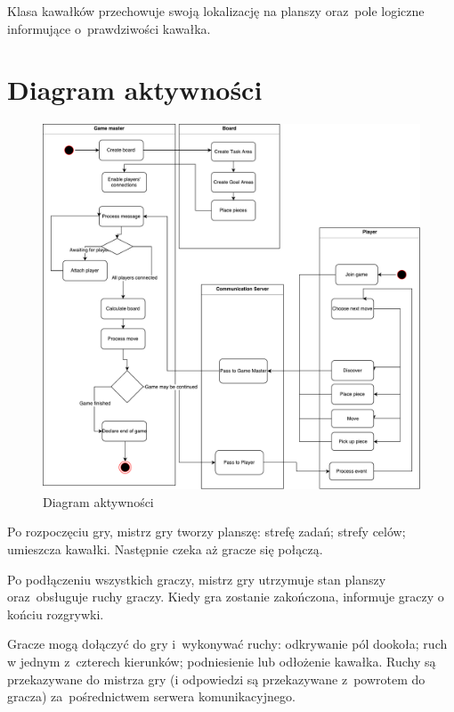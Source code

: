 \documentclass[a4paper]{article}
\begin{document}
Klasa kawałków przechowuje swoją lokalizację na planszy oraz~pole logiczne informujące o~prawdziwości kawałka.

\section{Diagram aktywności}
\begin{figure}[H]
\caption{Diagram aktywności}
\centering
\includegraphics[scale=0.5]{diagram_aktywnosci.pdf}
\end{figure}
Po rozpoczęciu gry, mistrz gry tworzy planszę: strefę zadań; strefy celów; umieszcza kawałki.
Następnie czeka aż gracze się połączą.

Po podłączeniu wszystkich graczy, mistrz gry utrzymuje stan planszy oraz~obsługuje ruchy graczy.
Kiedy gra zostanie zakończona, informuje graczy o końciu rozgrywki.

Gracze mogą dołączyć do gry i~wykonywać ruchy: odkrywanie pól dookoła; ruch w jednym z~czterech kierunków; podniesienie lub odłożenie kawałka.
Ruchy są przekazywane do mistrza gry (i odpowiedzi są przekazywane z~powrotem do gracza) za~pośrednictwem serwera komunikacyjnego.
\end{document}
